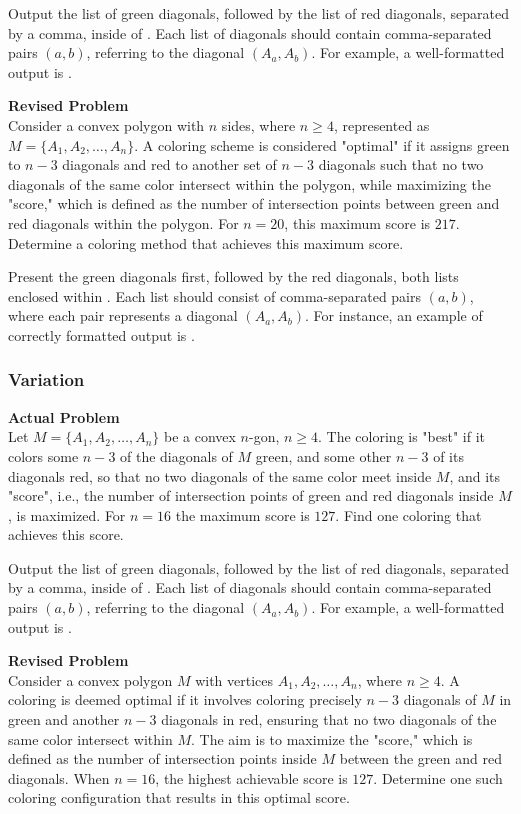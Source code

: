 Output the list of green diagonals, followed by the list of red diagonals, separated by a comma, inside of \boxed. Each list of diagonals should contain comma-separated pairs $(a,b)$, referring to the diagonal $(A_a, A_b)$. For example, a well-formatted output is .

\textbf{Revised Problem}\\
Consider a convex polygon with $n$ sides, where $n \geq 4$, represented as $M = \{A_1, A_2, \ldots, A_n\}$. A coloring scheme is considered "optimal" if it assigns green to $n-3$ diagonals and red to another set of $n-3$ diagonals such that no two diagonals of the same color intersect within the polygon, while maximizing the "score," which is defined as the number of intersection points between green and red diagonals within the polygon. For $n=20$, this maximum score is $217$. Determine a coloring method that achieves this maximum score.

Present the green diagonals first, followed by the red diagonals, both lists enclosed within \boxed. Each list should consist of comma-separated pairs $(a, b)$, where each pair represents a diagonal $(A_a, A_b)$. For instance, an example of correctly formatted output is .

\subsubsection{Variation}
\textbf{Actual Problem}\\
Let $M=\{A_1, A_2, \ldots, A_n\}$ be a convex $n$-gon, $n \geq 4$. 
The coloring is "best" if it colors some $n-3$ of the diagonals of $M$ green, and some other $n-3$ of its diagonals red, so that no two diagonals of the same color meet inside $M$, and its "score", i.e., the number of intersection points of green and red diagonals inside $M$, is maximized.
For $n=16$ the maximum score is $127$.
Find one coloring that achieves this score. 


Output the list of green diagonals, followed by the list of red diagonals, separated by a comma, inside of \boxed. Each list of diagonals should contain comma-separated pairs $(a,b)$, referring to the diagonal $(A_a, A_b)$. For example, a well-formatted output is .

\textbf{Revised Problem}\\
Consider a convex polygon $M$ with vertices $A_1, A_2, \ldots, A_n$, where $n \geq 4$. A coloring is deemed optimal if it involves coloring precisely $n-3$ diagonals of $M$ in green and another $n-3$ diagonals in red, ensuring that no two diagonals of the same color intersect within $M$. The aim is to maximize the "score," which is defined as the number of intersection points inside $M$ between the green and red diagonals. When $n=16$, the highest achievable score is $127$. Determine one such coloring configuration that results in this optimal score.

